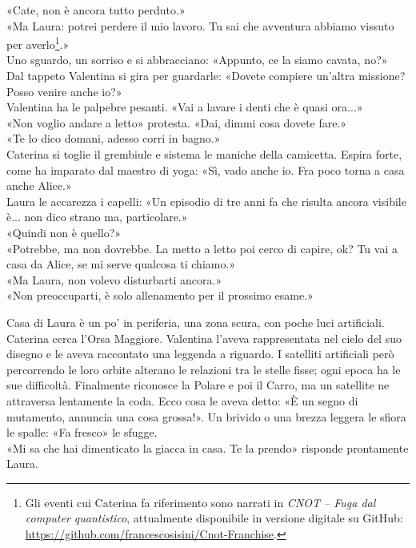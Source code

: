 «Cate, non \`e ancora tutto perduto.»\\
«Ma Laura: potrei perdere il mio lavoro. Tu sai che avventura abbiamo vissuto per averlo\footnote{Gli eventi cui Caterina fa riferimento sono narrati in
\emph{CNOT -- Fuga dal computer quantistico}, attualmente disponibile
in versione digitale su GitHub: \url{https://github.com/francescosisini/Cnot-Franchise}.}.»\\
Uno sguardo, un sorriso e si abbracciano: «Appunto, ce la siamo cavata, no?»\\
Dal tappeto Valentina si gira per guardarle: «Dovete compiere un'altra missione? Posso venire anche io?»\\
Valentina ha le palpebre pesanti. «Vai a lavare i denti che \`e quasi ora...»\\
«Non voglio andare a letto» protesta. «Dai, dimmi cosa dovete fare.»\\
«Te lo dico domani, adesso corri in bagno.»\\
Caterina si toglie il grembiule e sistema le maniche della camicetta. Espira forte, come ha imparato dal maestro di yoga: «Sì, vado anche io. Fra poco torna a casa anche Alice.»\\
Laura le accarezza i capelli:  «Un episodio di tre anni fa che risulta ancora visibile \`e... non dico strano ma, particolare.»\\
«Quindi non \`e quello?»\\
«Potrebbe, ma non dovrebbe. La metto a letto poi cerco di capire, ok? Tu vai a casa da Alice, se mi serve qualcosa ti chiamo.»\\

«Ma Laura, non volevo disturbarti ancora.»\\
«Non preoccuparti, \`e solo allenamento per il prossimo esame.»\\


\par\medskip
Casa di Laura \`e un po' in periferia, una zona scura, con poche luci artificiali. Caterina  cerca l'Orsa Maggiore. Valentina l'aveva rappresentata nel cielo del suo disegno e le aveva  raccontato una leggenda a riguardo. I satelliti artificiali per\`o percorrendo le loro orbite alterano le relazioni tra le stelle fisse; ogni epoca ha le sue difficoltà. Finalmente riconosce la Polare e poi il Carro, ma un satellite ne attraversa lentamente la coda. Ecco cosa le aveva detto: «\`E un segno di mutamento,   annuncia una cosa grossa!». Un brivido o una brezza leggera le sfiora le spalle: «Fa fresco» le sfugge.\\
«Mi sa che hai dimenticato la giacca in casa. Te la prendo» risponde prontamente Laura.

